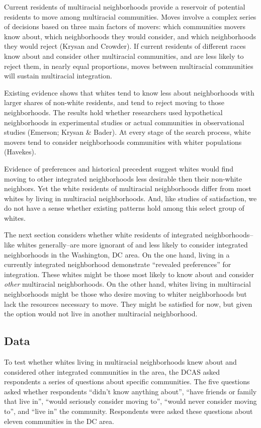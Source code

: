 \documentclass{baderart}
\begin{document}
Current residents of multiracial neighborhoods provide a reservoir of potential residents to move among multiracial communities. Moves involve a complex series of decisions based on three main factors of movers: which communities movers know about, which neighborhoods they would consider, and which neighborhoods they would reject (Krysan and Crowder). If current residents of different races know about and consider other multiracial communities, and are less likely to reject them, in nearly equal proportions, moves between multiracial communities will sustain multiracial integration.

Existing evidence shows that whites tend to know less about neighborhoods with larger shares of non-white residents, and tend to reject moving to those neighborhoods. The results hold whether researchers used hypothetical neighborhoods in experimental studies or actual communities in observational studies (Emerson; Krysan \& Bader). At every stage of the search process, white movers tend to consider neighborhoods communities with whiter populations (Havekes).

Evidence of preferences and historical precedent suggest whites would find moving to other integrated neighborhoods less desirable then their non-white neighbors. Yet the white residents of multiracial neighborhoods differ from most whites by living in multiracial neighborhoods. And, like studies of satisfaction, we do not have a sense whether existing patterns hold among this select group of whites.

The next section considers whether white residents of integrated neighborhoods--like whites generally--are more ignorant of and less likely to consider integrated neighborhoods in the Washington, DC area. On the one hand, living in a currently integrated neighborhood demonstrate ``revealed preferences'' for integration. These whites might be those most likely to know about and consider \emph{other} multiracial neighborhoods. On the other hand, whites living in multiracial neighborhoods might be those who desire moving to whiter neighborhoods but lack the resources necessary to move. They might be satisfied for now, but given the option would not live in another multiracial neighborhood.

\subsection{Data}\label{data}

To test whether whites living in multiracial neighborhoods knew about and considered other integrated communities in the area, the DCAS asked respondents a series of questions about specific communities. The five questions asked whether respondents ``didn't know anything about'', ``have friends or family that live in'', ``would seriously consider moving to'', ``would never consider moving to'', and ``live in'' the community. Respondents were asked these questions about eleven communities in the DC area.
\end{document}
